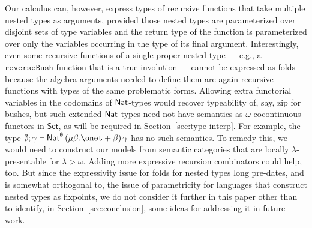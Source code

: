 \documentclass[runningheads]{llncs}
\newcommand{\set}{\mathsf{Set}}
\begin{document}
Our calculus can, however, express types of recursive functions
that take
multiple nested types as arguments, provided those nested types are
parameterized over disjoint sets of type variables and the return type of
the function is parameterized over only
the variables occurring in the type of its final argument.
Interestingly, even some recursive functions of a single proper
nested type --- e.g., a $\mathtt{reverseBush}$ function that is a true
involution --- cannot be expressed as folds because the algebra
arguments needed to define them are again recursive functions
with types of the same problematic forms.
Allowing extra functorial variables in the codomains of $\mathsf{Nat}$-types
would recover typeability of, say, zip for bushes, but such extended
$\mathsf{Nat}$-types need not have semantics as $\omega$-cocontinuous functors
in $\set$, as will be required in Section~\ref{sec:type-interp}. For
example,
the type $\emptyset; \gamma \vdash \Nat^\emptyset\, (\mu \beta. \onet + \beta)\,
\gamma$ has no such semantics. To remedy this, we would need to
construct our models from semantic categories that are locally
$\lambda$-presentable for $\lambda > \omega$.
%
Adding more expressive recursion combinators could help, too.
But since the expressivity issue for folds for nested types long
pre-dates, and is somewhat orthogonal to, the issue of parametricity
for languages that construct nested types as fixpoints, we do not
consider it further in this paper other than to identify, in
Section~\ref{sec:conclusion}, some ideas for addressing it in future
work.
\end{document}
